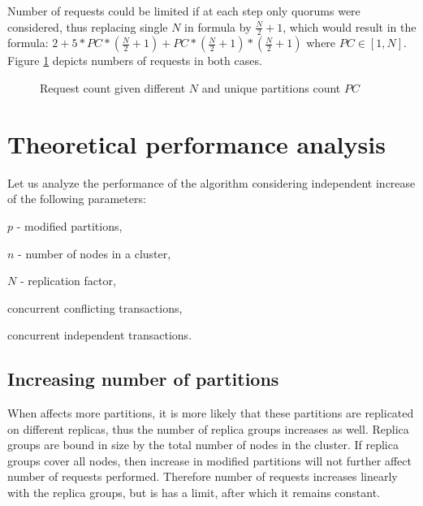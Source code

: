 Number of requests could be limited if at each step only quorums were considered, thus replacing single $N$ in formula by $\frac{N}{2} + 1$, which would result in the formula: 
$2 + 5 * PC*(\frac{N}{2} + 1) + PC * (\frac{N}{2} + 1) * (\frac{N}{2} + 1)$ where $PC \in [1, N]$.
Figure \ref{fig:tests:requestsCount} depicts numbers of requests in both cases.


\begin{figure}[hbt]
  \centering
  \setlength{\unitlength}{1.3cm}  
  \caption{Request count given different $N$ and unique partitions count $PC$}
  \label{fig:tests:requestsCount}
\end{figure}

\section{Theoretical performance analysis}
Let us analyze the performance of the \mpt algorithm considering independent increase of the following parameters: 
\begin{enumerate*}
\item $p$ - modified partitions,
\item $n$ - number of nodes in a cluster,
\item $N$ - replication factor,
\item concurrent conflicting transactions,
\item concurrent independent transactions.
\end{enumerate*}

\subsection{Increasing number of partitions}
\label{sec:tests:perf:partitions}
When \mpt affects more partitions, it is more likely that these partitions are replicated on different replicas, thus the number of replica groups increases as well. Replica groups are bound in size by the total number of nodes in the cluster. If replica groups cover all nodes, then increase in modified partitions will not further affect number of requests performed. Therefore number of requests increases linearly with the replica groups, but is has a limit, after which it remains constant.

